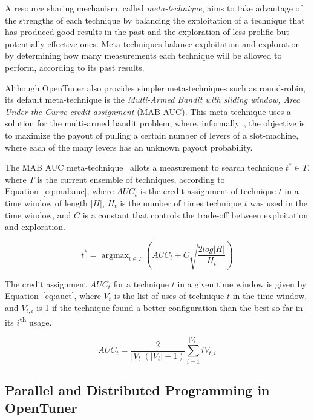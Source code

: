 A resource sharing mechanism, called \emph{meta-technique}, aims to take
advantage of the strengths of each technique by balancing the exploitation of a
technique that has produced good results in the past and the exploration of
less prolific but potentially effective ones.  Meta-techniques balance
exploitation and exploration by determining how many measurements each
technique will be allowed to perform, according to its past results.

Although OpenTuner also provides simpler meta-techniques such as round-robin,
its default meta-technique is the \textit{Multi-Armed Bandit with sliding
window, Area Under the Curve credit assignment} (MAB AUC).  This meta-technique
uses a solution for the multi-armed bandit problem, where,
informally~\cite{ansel2014opentuner}, the objective is to maximize the payout
of pulling a certain number of levers of a slot-machine, where each of the many
levers has an unknown payout probability.

The MAB AUC meta-technique~\cite{ansel2014opentuner} allots a measurement to
search technique $t^{*} \in T$, where $T$ is the current ensemble of
techniques, according to Equation~\ref{eq:mabauc}, where $AUC_t$ is the credit
assignment of technique $t$ in a time window of length $|H|$, $H_t$ is the
number of times technique $t$ was used in the time window, and $C$ is a
constant that controls the trade-off between exploitation and exploration.

\begin{equation}
    t^{*} = \mathop{\text{argmax}}_{t \in T}\left(AUC_t + C \sqrt{\frac{2log|H|}{H_t}}\right)
    \label{eq:mabauc}
\end{equation}

The credit assignment $AUC_t$ for a technique $t$ in a given time window is given
by Equation~\ref{eq:auct}, where $V_t$ is the list of uses of technique $t$ in
the time window, and $V_{t,i}$ is 1 if the technique found a better configuration
than the best so far in its $i$\textsuperscript{th} usage.

\begin{equation}
    AUC_t = \frac{2}{|V_t|(|V_t| + 1)} \sum\limits_{i = 1}^{|V_t|}{iV_{t,i}}
    \label{eq:auct}
\end{equation}

\subsection{Parallel and Distributed Programming in OpenTuner}
\label{sec:opentuner-parallel}

